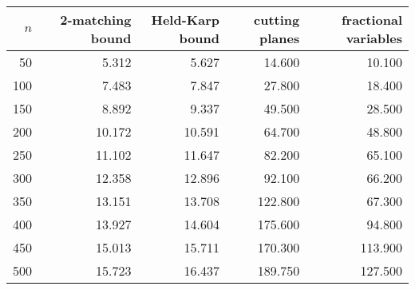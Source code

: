 \documentclass{article}
\begin{document}
\begin{tabular}{|rrrrr|}
\hline
$n$ & 2-matching bound & Held-Karp bound & cutting planes & fractional variables \\
\hline
50 & 5.312 & 5.627 & 14.600 & 10.100 \\
100 & 7.483 & 7.847 & 27.800 & 18.400 \\
150 & 8.892 & 9.337 & 49.500 & 28.500 \\
200 & 10.172 & 10.591 & 64.700 & 48.800 \\
250 & 11.102 & 11.647 & 82.200 & 65.100 \\
300 & 12.358 & 12.896 & 92.100 & 66.200 \\
350 & 13.151 & 13.708 & 122.800 & 67.300 \\
400 & 13.927 & 14.604 & 175.600 & 94.800 \\
450 & 15.013 & 15.711 & 170.300 & 113.900 \\
500 & 15.723 & 16.437 & 189.750 & 127.500 \\
\hline
\end{tabular}
\end{document}
